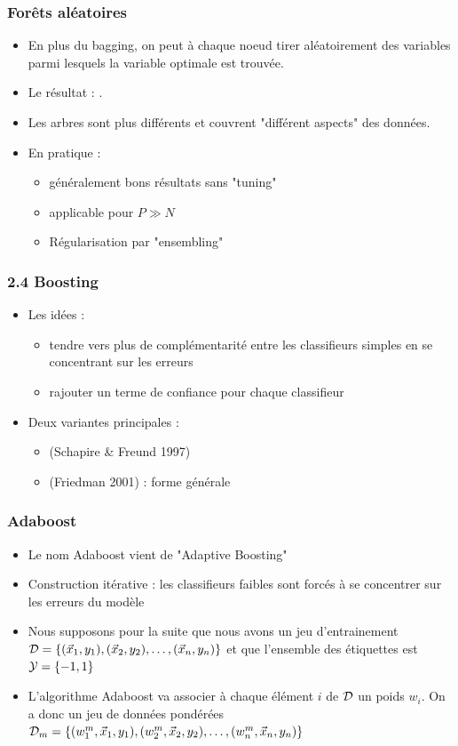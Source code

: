 \begin{frame}
  \frametitle{Forêts aléatoires}
  \begin{itemize}
    \item En plus du bagging, on peut à chaque noeud tirer aléatoirement des variables parmi lesquels la variable optimale est trouvée. 
    \item Le résultat : . 
    \item Les arbres sont plus différents et couvrent "différent aspects" des données. 
    \item En pratique : 
    \begin{itemize}
      \item généralement bons résultats sans "tuning"
      \item applicable pour $P \gg N$
      \item Régularisation par "ensembling"
    \end{itemize}
  \end{itemize}

\end{frame}

\begin{frame}
  \frametitle{2.4 Boosting}
  \begin{itemize}
    \item Les idées : 
      \begin{itemize}
      \item tendre vers plus de complémentarité entre les classifieurs simples en se concentrant sur les erreurs
      \item rajouter un terme de confiance pour chaque classifieur
    \end{itemize}
    \item Deux variantes principales : 
    \begin{itemize}
    \item {} (Schapire \& Freund 1997) 
    \item {} (Friedman 2001) : forme générale
    \end{itemize}
  \end{itemize}
\end{frame}


\begin{frame}
  \frametitle{Adaboost}
  \begin{itemize}
    \item Le nom Adaboost vient de "Adaptive Boosting"
    \item Construction itérative : les classifieurs faibles sont forcés à se concentrer sur les erreurs du modèle
    \item Nous supposons pour la suite que nous avons un jeu d'entrainement $\mathcal{D} = \{(\vec{x}_1, y_1), (\vec{x}_2, y_2), \dots, (\vec{x}_n, y_n)\}$ et que l'ensemble des étiquettes est $\mathcal{Y}=\{-1,1\}$
    \item L'algorithme Adaboost va associer à chaque élément $i$ de $\mathcal{D}$ un poids $w_i$. On a donc un jeu de données pondérées $\mathcal{D}_m = \{(w^m_1, \vec{x}_1, y_1), (w^m_2, \vec{x}_2, y_2), \dots, (w^m_n, \vec{x}_n, y_n)\}$ 
  \end{itemize}

\end{frame}

